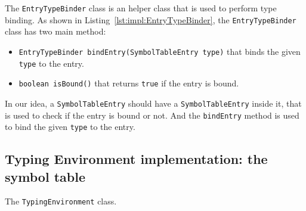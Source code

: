 The \texttt{EntryTypeBinder} class is an helper class that is used to perform type binding. As shown in Listing~\ref{lst:impl:EntryTypeBinder}, the \texttt{EntryTypeBinder} class has two main method:
\begin{itemize}
    \item \texttt{EntryTypeBinder bindEntry(SymbolTableEntry type)} that binds the given \texttt{type} to the entry.
    \item \texttt{boolean isBound()} that returns \texttt{true} if the entry is bound.
\end{itemize}

In our idea, a \texttt{SymbolTableEntry} should have a \texttt{SymbolTableEntry} inside it, that is used to check if the entry is bound or not. And the \texttt{bindEntry} method is used to bind the given \texttt{type} to the entry.

\subsection{Typing Environment implementation: the symbol table}\label{subsec:impl:TypingEnvironment}


\begin{Listing}[tb]
    \centering
    \caption{The \texttt{TypingEnvironment} class.}
    \label{lst:impl:TypingEnvironment}
\end{Listing}

